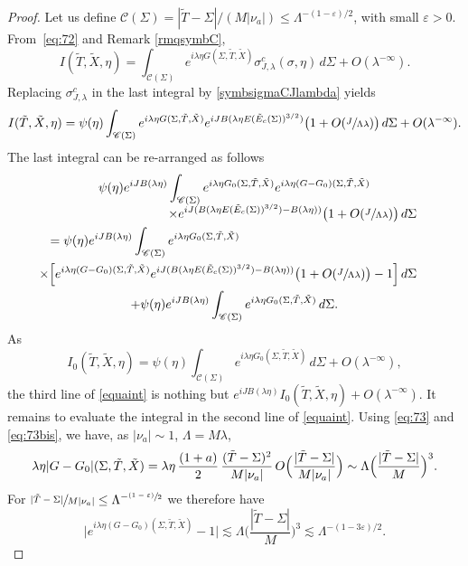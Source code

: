 \documentclass[JEP,XML,SOM,Unicode,NoEqCountersInSection,NoFloatCountersInSection,published]{cedram}
\let\mathcal\mathscr
\let\epsilon\varepsilon
\theoremstyle{plain}
\theoremstyle{definition}
\begin{document}
\begin{proof}
Let us define $\mathcal{C}(\Sigma)=|\tilde T-\Sigma|/(M|\nu_a|)\leq \Lambda^{-(1-\epsilon)/2}$, with small $\epsilon>0$. From~\eqref{eq:72} and Remark \ref{rmqsymbC},
\[
I(\tilde T,\tilde X,\eta)=\int_{\mathcal{C}(\Sigma)}e^{i\lambda \eta G(\Sigma,\tilde T,\tilde X)}\sigma^{c}_{J,\lambda}(\sigma,\eta)\,d\Sigma+O(\lambda^{-\infty}).
\]
Replacing $\sigma^{c}_{J,\lambda}$ in the last integral by \eqref{symbsigmaCJlambda} yields
\[
I(\tilde T,\tilde X,\eta)=\psi(\eta)\int_{\mathcal{C}(\Sigma)}e^{i\lambda \eta G(\Sigma,\tilde T,\tilde X)}e^{iJB(\lambda\eta E(\tilde E_c(\Sigma))^{3/2})}\bigl(1+O(\sfrac{J}{\Lambda\lambda})\bigr)\,d\Sigma+O(\lambda^{-\infty}).
\]
The last integral can be re-arranged as follows
\begin{multline}\label{equaint}
\psi(\eta)e^{iJB(\lambda\eta)}\int_{\mathcal{C}(\Sigma)} e^{i\lambda \eta G_0(\Sigma,\tilde T,\tilde X)} e^{i\lambda \eta (G-G_0)(\Sigma,\tilde T,\tilde X)}
\\[
-5pt]
\shoveright{\times e^{iJ(B(\lambda\eta E(\tilde E_c(\Sigma))^{3/2})-B(\lambda\eta))}\bigl(1+O(\sfrac{J}{\Lambda\lambda})\bigr)\,d\Sigma}\\
\shoveleft{=\psi(\eta)e^{iJB(\lambda\eta)}\int_{\mathcal{C}(\Sigma)}e^{i\lambda \eta G_0(\Sigma,\tilde T,\tilde X)}}\\
\shoveright{\times \Big[e^{i\lambda \eta (G-G_0)(\Sigma,\tilde T,\tilde X)}e^{iJ(B(\lambda\eta E(\tilde E_c(\Sigma))^{3/2})-B(\lambda\eta))}\bigl(1+O(\sfrac{J}{\Lambda\lambda})\bigr)-1\Big]\,d\Sigma}
\\
+\psi(\eta)e^{iJB(\lambda\eta)}\int_{\mathcal{C}(\Sigma)}e^{i\lambda \eta G_0(\Sigma,\tilde T,\tilde X)}\,d\Sigma.
\end{multline}
As
\[
I_0(\tilde T,\tilde X,\eta)=\psi(\eta)\int_{\mathcal{C}(\Sigma)}e^{i\lambda \eta G_0(\Sigma,\tilde T,\tilde X)}\,d\Sigma+O(\lambda^{-\infty}),
\]
the third line of \eqref{equaint} is nothing but $e^{iJB(\lambda\eta)}I_0(\tilde T,\tilde X,\eta)+O(\lambda^{-\infty})$. It remains to evaluate the integral in the second line of \eqref{equaint}. Using \eqref{eq:73} and \eqref{eq:73bis}, we have, as $|\nu_a|\sim 1$, $\Lambda=M\lambda$,
\[
\lambda \eta |G-G_0|(\Sigma,\tilde T,\tilde X)=\lambda \eta\,\frac{(1+a)}{2}\,\frac{(\tilde T-\Sigma)^2}{M|\nu_a|}\,O\Bigl(\frac{|\tilde T-\Sigma|}{M|\nu_a|}\Bigr)\sim \Lambda\Big(\frac{|\tilde T-\Sigma|}{M}\Big)^3.
\]
For $\sfrac{|\tilde T-\Sigma|}{M|\nu_a|}\leq \Lambda^{-\sfrac{(1-\epsilon)}{2}}$ we therefore have
\[
\bigl|e^{i\lambda \eta (G-G_0)(\Sigma,\tilde T,\tilde X)}-1\bigr|\lesssim \Lambda\Big(\frac{|\tilde T-\Sigma|}{M}\Big)^3\lesssim \Lambda^{-(1-3\epsilon)/2}.
\]
\end{proof}
\end{document}
